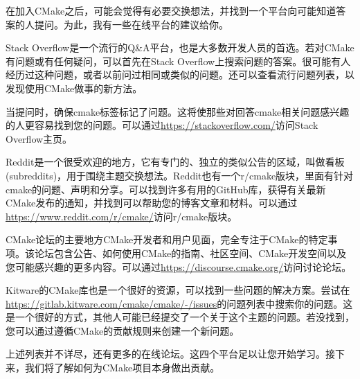 
在加入CMake之后，可能会觉得有必要交换想法，并找到一个平台向可能知道答案的人提问。为此，我有一些在线平台的建议给你。


Stack Overflow是一个流行的Q\&A平台，也是大多数开发人员的首选。若对CMake有问题或有任何疑问，可以首先在Stack Overflow上搜索问题的答案。很可能有人经历过这种问题，或者以前问过相同或类似的问题。还可以查看流行问题列表，以发现使用CMake做事的新方法。

当提问时，确保cmake标签标记了问题。这将使那些对回答cmake相关问题感兴趣的人更容易找到您的问题。可以通过\url{https://stackoverflow.com/}访问Stack Overflow主页。


Reddit是一个很受欢迎的地方，它有专门的、独立的类似公告的区域，叫做看板(subreddits)，用于围绕主题交换想法。Reddit也有一个r/cmake版块，里面有针对cmake的问题、声明和分享。可以找到许多有用的GitHub库，获得有关最新CMake发布的通知，并找到可以帮助您的博客文章和材料。可以通过\url{https://www.reddit.com/r/cmake/}访问r/cmake版块。


CMake论坛的主要地方CMake开发者和用户见面，完全专注于CMake的特定事项。该论坛包含公告、如何使用CMake的指南、社区空间、CMake开发空间以及您可能感兴趣的更多内容。可以通过\url{https://discourse.cmake.org/}访问讨论论坛。


Kitware的CMake库也是一个很好的资源，可以找到一些问题的解决方案。尝试在\url{https://gitlab.kitware.com/cmake/cmake/-/issues}的问题列表中搜索你的问题。这是一个很好的方式，其他人可能已经提交了一个关于这个主题的问题。若没找到，您可以通过遵循CMake的贡献规则来创建一个新问题。

上述列表并不详尽，还有更多的在线论坛。这四个平台足以让您开始学习。接下来，我们将了解如何为CMake项目本身做出贡献。
